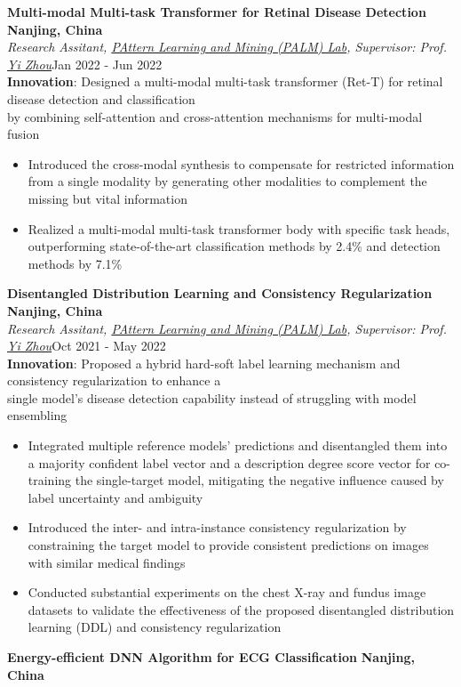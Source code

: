 \documentclass[letterpaper,11pt]{article}
\begin{document}
{\bf Multi-modal Multi-task Transformer for Retinal Disease Detection} \hfill{\textbf{Nanjing, China}}\\

\textit{Research Assitant, {\href{http://palm.seu.edu.cn/members.html}{PAttern Learning and Mining (PALM) Lab}}, Supervisor: Prof. {\href{https://scholar.google.co.uk/citations?user=EnDCJKMAAAAJ&hl=en}{Yi Zhou}}}\hfill{Jan 2022 - Jun 2022}
\\

\textbf{Innovation}: Designed a multi-modal multi-task transformer (Ret-T) for retinal disease detection and classification\\
\hspace{63pt} by combining self-attention and cross-attention mechanisms for multi-modal fusion
\begin{itemize}
    \item Introduced the cross-modal synthesis to compensate for restricted information from a single modality by generating other modalities to complement the missing but vital information
    \item Realized a multi-modal multi-task transformer body with specific task heads, outperforming state-of-the-art classification methods by 2.4\% and detection methods by 7.1\%
\end{itemize}
\vspace{2pt}

{\bf Disentangled Distribution Learning and Consistency Regularization} \hfill{\textbf{Nanjing, China}}\\
\textit{Research Assitant, {\href{http://palm.seu.edu.cn/members.html}{PAttern Learning and Mining (PALM) Lab}}, Supervisor: Prof. {\href{https://scholar.google.co.uk/citations?user=EnDCJKMAAAAJ&hl=en}{Yi Zhou}}}\hfill{Oct 2021 - May 2022}\\

\textbf{Innovation}: Proposed a hybrid hard-soft label learning mechanism and consistency regularization to enhance a\\
\hspace{63pt} single model's disease detection capability instead of struggling with model ensembling
\begin{itemize}
    \item Integrated multiple reference models' predictions and disentangled them into a majority confident label vector and a description degree score vector for co-training the single-target model, mitigating the negative influence caused by label uncertainty and ambiguity
    \item Introduced the inter- and intra-instance consistency regularization by constraining the target model to provide consistent predictions on images with similar medical findings
    \item Conducted substantial experiments on the chest X-ray and fundus image datasets to validate the effectiveness
    of the proposed disentangled distribution learning (DDL) and consistency regularization
\end{itemize}
\vspace{2pt}
{\bf Energy-efficient DNN Algorithm for ECG Classification} \hfill{\textbf{Nanjing, China}}\\
\end{document}
